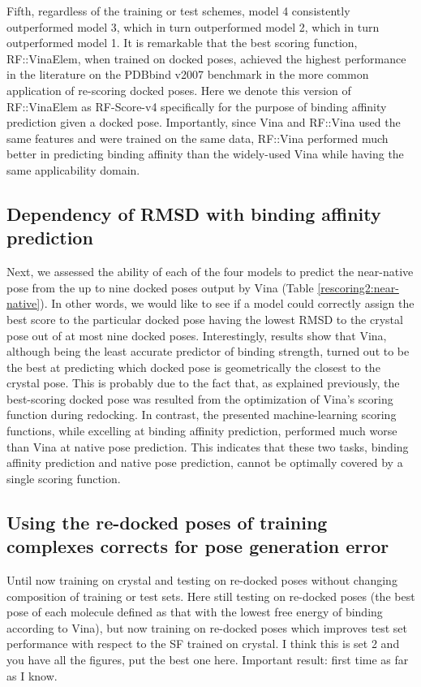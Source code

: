 \documentclass[twocolumn]{bmcart}
\begin{document}
Fifth, regardless of the training or test schemes, model 4 consistently outperformed model 3, which in turn outperformed model 2, which in turn outperformed model 1. It is remarkable that the best scoring function, RF::VinaElem, when trained on docked poses, achieved the highest performance in the literature on the PDBbind v2007 benchmark in the more common application of re-scoring docked poses. Here we denote this version of RF::VinaElem as RF-Score-v4 specifically for the purpose of binding affinity prediction given a docked pose. Importantly, since Vina and RF::Vina used the same features and were trained on the same data, RF::Vina performed much better in predicting binding affinity than the widely-used Vina while having the same applicability domain.

\subsection*{Dependency of RMSD with binding affinity prediction}

Next, we assessed the ability of each of the four models to predict the near-native pose from the up to nine docked poses output by Vina (Table \ref{rescoring2:near-native}). In other words, we would like to see if a model could correctly assign the best score to the particular docked pose having the lowest RMSD to the crystal pose out of at most nine docked poses. Interestingly, results show that Vina, although being the least accurate predictor of binding strength, turned out to be the best at predicting which docked pose is geometrically the closest to the crystal pose. This is probably due to the fact that, as explained previously, the best-scoring docked pose was resulted from the optimization of Vina's scoring function during redocking. In contrast, the presented machine-learning scoring functions, while excelling at binding affinity prediction, performed much worse than Vina at native pose prediction. This indicates that these two tasks, binding affinity prediction and native pose prediction, cannot be optimally covered by a single scoring function.

\subsection*{Using the re-docked poses of training complexes corrects for pose generation error}

Until now training on crystal and testing on re-docked poses without changing composition of training or test sets. Here still testing on re-docked poses (the best pose of each molecule defined as that with the lowest free energy of binding according to Vina), but now training on re-docked poses which improves test set performance with respect to the SF trained on crystal. I think this is set 2 and you have all the figures, put the best one here. Important result: first time as far as I know.
\end{document}
